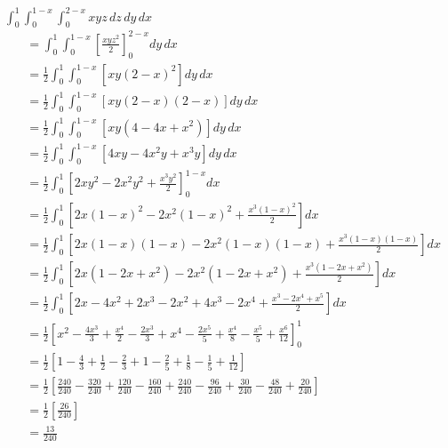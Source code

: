 \documentclass[12pt]{article}
\newenvironment{problem}[2][]{
    \begin{trivlist}
        \item[
            {\bfseries #1}
            {\bfseries #2.}
        ]
}{\end{trivlist}}
\begin{document}
\begin{problem}{23}
    $\displaystyle\int_0^1 \displaystyle\int_0^{1 - x} \displaystyle\int_0^{2 - x} xyz \, dz \, dy \, dx$
    \begin{align}
        &= \int_0^1 \int_0^{1 - x} \left[\frac{xyz^2}{2}\right]_0^{2 - x} dy \, dx \\
        &= \frac{1}{2} \int_0^1 \int_0^{1 - x} \left[xy \left(2 - x\right)^2\right] dy \, dx \\
        &= \frac{1}{2} \int_0^1 \int_0^{1 - x} \left[xy \left(2 - x\right) \left(2 - x\right)\right] dy \, dx \\
        &= \frac{1}{2} \int_0^1 \int_0^{1 - x} \left[xy \left(4 - 4x + x^2\right)\right] dy \, dx \\
        &= \frac{1}{2} \int_0^1 \int_0^{1 - x} \left[4xy - 4x^2y + x^3y\right] dy \, dx \\
        &= \frac{1}{2} \int_0^1 \left[2xy^2 - 2x^2y^2 + \frac{x^3y^2}{2}\right]_0^{1 - x} dx \\
        &= \frac{1}{2} \int_0^1 \left[2x\left(1 - x\right)^2 - 2x^2\left(1 - x\right)^2 + \frac{x^3\left(1 - x\right)^2}{2}\right] dx \\
        &= \frac{1}{2} \int_0^1 \left[2x \left(1 - x\right) \left(1 - x\right) - 2x^2 \left(1 - x\right) \left(1 - x\right) + \frac{x^3 \left(1 - x\right) \left(1 - x\right)}{2}\right] dx \\
        &= \frac{1}{2} \int_0^1 \left[2x \left(1 - 2x + x^2\right) - 2x^2 \left(1 - 2x + x^2\right) + \frac{x^3 \left(1 - 2x + x^2\right)}{2}\right] dx \\
        &= \frac{1}{2} \int_0^1 \left[2x - 4x^2 + 2x^3 - 2x^2 + 4x^3 - 2x^4 + \frac{x^3 - 2x^4 + x^5}{2}\right] dx \\
        &= \frac{1}{2} \left[x^2 - \frac{4x^3}{3} + \frac{x^4}{2} - \frac{2x^3}{3} + x^4 - \frac{2x^5}{5} + \frac{x^4}{8} - \frac{x^5}{5} + \frac{x^6}{12}\right]_0^1 \\
        &= \frac{1}{2} \left[1 - \frac{4}{3} + \frac{1}{2} - \frac{2}{3} + 1 - \frac{2}{5} + \frac{1}{8} - \frac{1}{5} + \frac{1}{12}\right] \\
        &= \frac{1}{2} \left[\frac{240}{240} - \frac{320}{240} + \frac{120}{240} - \frac{160}{240} + \frac{240}{240} - \frac{96}{240} + \frac{30}{240} - \frac{48}{240} + \frac{20}{240}\right] \\
        &= \frac{1}{2} \left[\frac{26}{240}\right] \\
        &= \frac{13}{240}
    \end{align}
\end{problem}
\end{document}
